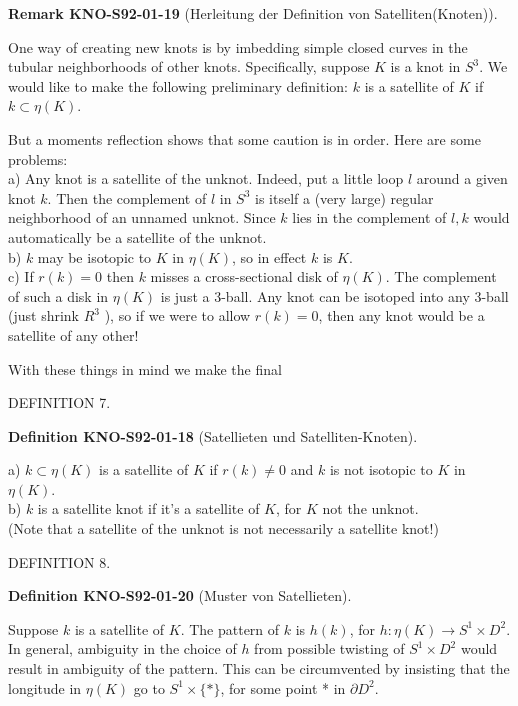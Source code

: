 \documentclass[10pt, letterpaper]{article}
\newcommand{\CustomHeading}[3]{%
  \par\medskip\noindent%
  \textbf{#1 #2} \textnormal{(#3)}.\enskip%
}
\newenvironment{DEF}[2]{\begin{unitbox}\CustomHeading{Definition}{#1}{#2}}{\end{unitbox}}
\newenvironment{REM}[2]{\begin{unitbox}\CustomHeading{Remark}{#1}{#2}}{\end{unitbox}}
\begin{document}
\begin{REM}{KNO-S92-01-19}{Herleitung der Definition von Satelliten(Knoten)}
One way of creating new knots is by imbedding simple closed curves in the tubular neighborhoods of other knots. Specifically, suppose $K$ is a knot in $S^{3}$. We would like to make the following preliminary definition: $k$ is a satellite of $K$ if $k \subset \eta(K)$.

But a moments reflection shows that some caution is in order. Here are some problems:\\
a) Any knot is a satellite of the unknot. Indeed, put a little loop $l$ around a given knot $k$. Then the complement of $l$ in $S^{3}$ is itself a (very large) regular neighborhood of an unnamed unknot. Since $k$ lies in the complement of $l, k$ would automatically be a satellite of the unknot.\\
b) $k$ may be isotopic to $K$ in $\eta(K)$, so in effect $k$ is $K$.\\
c) If $r(k)=0$ then $k$ misses a cross-sectional disk of $\eta(K)$. The complement of such a disk in $\eta(K)$ is just a 3-ball. Any knot can be isotoped into any 3-ball (just shrink $R^{3}$ ), so if we were to allow $r(k)=0$, then any knot would be a satellite of any other!
\end{REM}

With these things in mind we make the final

DEFINITION 7. 

\begin{DEF}{KNO-S92-01-18}{Satellieten und Satelliten-Knoten}
a) $k \subset \eta(K)$ is a satellite of $K$ if $r(k) \neq 0$ and $k$ is not isotopic to $K$ in $\eta(K)$.\\
b) $k$ is a satellite knot if it's a satellite of $K$, for $K$ not the unknot.\\
(Note that a satellite of the unknot is not necessarily a satellite knot!)
\end{DEF}


DEFINITION 8. 

\begin{DEF}{KNO-S92-01-20}{Muster von Satellieten}
Suppose $k$ is a satellite of $K$. The pattern of $k$ is $h(k)$, for $h: \eta(K) \rightarrow S^{1} \times D^{2}$. In general, ambiguity in the choice of $h$ from possible twisting of $S^{1} \times D^{2}$ would result in ambiguity of the pattern. This can be circumvented by insisting that the longitude in $\eta(K)$ go to $S^{1} \times\{*\}$, for some point * in $\partial D^{2}$.
\end{DEF}
\end{document}
